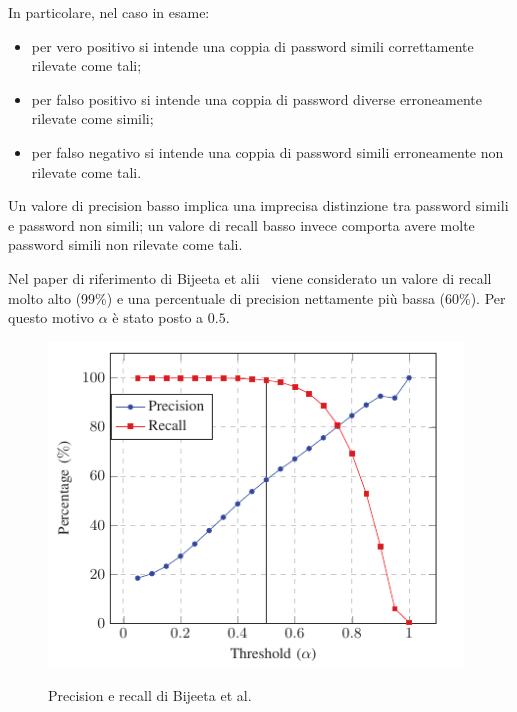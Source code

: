In particolare, nel caso in esame:
\begin{itemize}
    \item per vero positivo si intende una coppia di password simili correttamente rilevate come tali;
    \item per falso positivo si intende una coppia di password diverse erroneamente rilevate come simili;
    \item per falso negativo si intende una coppia di password simili erroneamente non rilevate come tali.
\end{itemize}
Un valore di precision basso implica una imprecisa distinzione tra password simili e password non simili; un valore di recall basso invece comporta avere molte password simili non rilevate come tali.

Nel paper di riferimento di Bijeeta et alii~\cite{bijeeta} viene considerato un valore di recall molto alto (99\%) e una percentuale di precision nettamente più bassa (60\%). Per questo motivo $\alpha$ è stato posto a $0.5$.

\begin{figure}[h]
    \centering
    \includegraphics[width=11cm]{./immagini/precision_recall_paper_bijeeta.png}
    \label{precisionbijeeta}
    \caption{Precision e recall di Bijeeta et al.~\cite{bijeeta}}
\end{figure}

